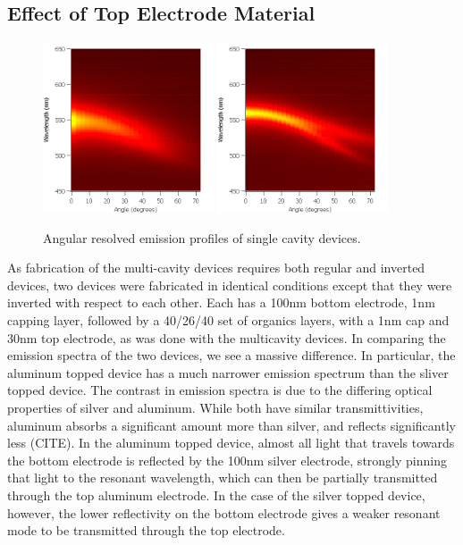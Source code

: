 \documentclass{report}
\begin{document}
        \subsection{Effect of Top Electrode Material}
            \begin{figure}[h]
                \centering
                \includegraphics[width=0.45\textwidth]{images/n1_ag_top_heatmap.png}
                \includegraphics[width=0.45\textwidth]{images/n1_al_top_heatmap.png}
                \caption{Angular resolved emission profiles of single cavity devices.}
            \end{figure}

            As fabrication of the multi-cavity devices requires both regular and inverted devices, two devices were fabricated in identical conditions except that they were inverted with respect to each other. Each has a 100nm bottom electrode, 1nm capping layer, followed by a 40/26/40 set of organics layers, with a 1nm cap and 30nm top electrode, as was done with the multicavity devices. In comparing the emission spectra of the two devices, we see a massive difference. In particular, the aluminum topped device has a much narrower emission spectrum than the sliver topped device. The contrast in emission spectra is due to the differing optical properties of silver and aluminum. While both have similar transmittivities, aluminum absorbs a significant amount more than silver, and reflects significantly less (CITE). In the aluminum topped device, almost all light that travels towards the bottom electrode is reflected by the 100nm silver electrode, strongly pinning that light to the resonant wavelength, which can then be partially transmitted through the top aluminum electrode. In the case of the silver topped device, however, the lower reflectivity on the bottom electrode gives a weaker resonant mode to be transmitted through the top electrode.
\end{document}
